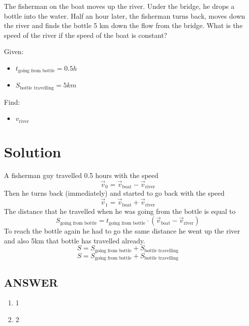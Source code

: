 The fisherman on the boat moves up the river. Under the bridge, he drops a bottle into the water.
Half an hour later, the fisherman turns back, moves down the river and finds the bottle 5 km
down the flow from the bridge. What is the speed of the river if the speed of the boat is constant?

\bigbreak Given: \begin{itemize}
    \item $t_{\text{going from bottle}} = 0.5h$
    \item $S_{\text{bottle travelling}} = 5km$
\end{itemize}

Find: \begin{itemize}
    \item $v_{\text{river}}$
\end{itemize}

\section*{Solution}

A fisherman guy travelled 0.5 hours with the speed $$\Vec{v}_0 = \Vec{v}_{\text{boat}} - \Vec{v}_{\text{river}}$$
Then he turns back (immediately) and started to go back with the speed $$\Vec{v}_1 = \Vec{v}_{\text{boat}} + \Vec{v}_{\text{river}}$$
The distance that he travelled when he was going from the bottle is equal to $$S_{\text{going from bottle}} = t_{\text{going from bottle}} \cdot (\Vec{v}_{\text{boat}} - \Vec{v}_{\text{river}})$$
To reach the bottle again he had to go the same distance he went up the river and also 5km that bottle has travelled already.
$$S = S_{\text{going from bottle}} + S_{\text{bottle travelling}}$$
$$S = S_{\text{going from bottle}} + S_{\text{bottle travelling}}$$


\vfill
\subsection*{ANSWER}
\begin{enumerate}
    \item 1
    \item 2
\end{enumerate}

